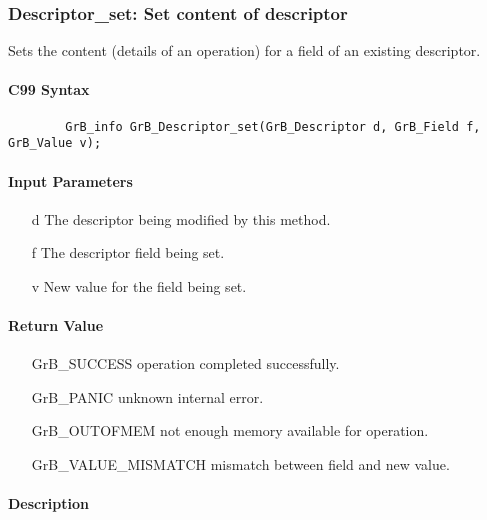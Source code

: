 \subsubsection{{\sf Descriptor\_set}: Set content of descriptor}

Sets the content (details of an operation) for a field of an existing
descriptor.

\paragraph{C99 Syntax}

\begin{verbatim}
        GrB_info GrB_Descriptor_set(GrB_Descriptor d, GrB_Field f, GrB_Value v);
\end{verbatim}

\paragraph{Input Parameters}

\begin{itemize}[leftmargin=1.1in]
    \item[{\sf d}] The descriptor being modified by this method.
    \item[{\sf f}] The descriptor field being set.
    \item[{\sf v}] New value for the field being set.
\end{itemize}

\paragraph{Return Value}

\begin{itemize}[leftmargin=2.1in]
\item[{\sf GrB\_SUCCESS}]           operation completed successfully.
\item[{\sf GrB\_PANIC}]             unknown internal error.
\item[{\sf GrB\_OUTOFMEM}]          not enough memory available for operation.
\item[{\sf GrB\_VALUE\_MISMATCH}]   mismatch between field and new value.
\end{itemize}

\paragraph{Description}


